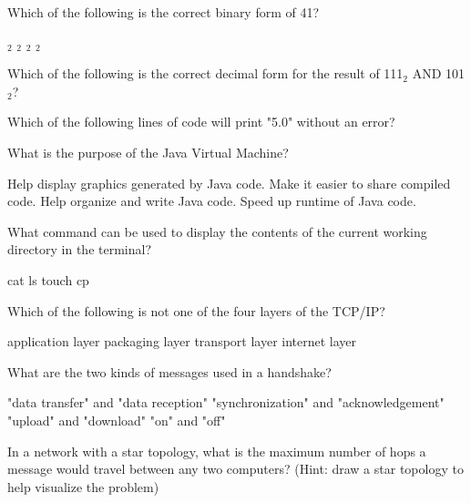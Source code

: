 \documentclass[answers,addpoints]{exam} %
\begin{document}
\begin{questions}
\question[2] Which of the following is the correct binary form of 41?
\begin{choices}
    $_2$
    $_2$
    $_2$
    $_2$
\end{choices}

\question[2] Which of the following is the correct decimal form for the result of 111$_2$ AND 101$_2$?
\begin{choices}
\end{choices}

\question[2] Which of the following lines of code will print "5.0" without an error? 
\begin{choices}
    \CorrectChoice {}
    \choice {}
    \choice {}
    \choice {}
\end{choices}

\question[2] What is the purpose of the Java Virtual Machine? 
\begin{choices}
    \choice Help display graphics generated by Java code. 
    \CorrectChoice Make it easier to share compiled code. 
    \choice Help organize and write Java code. 
    \choice Speed up runtime of Java code. 
\end{choices}

\question[2] What command can be used to display the contents of the current working directory in the terminal?
\begin{choices}
    \choice cat
    \CorrectChoice ls
    \choice touch
    \choice cp
\end{choices}

\question[2] Which of the following is not one of the four layers of the TCP/IP?
\begin{choices}
    \choice application layer
    \CorrectChoice packaging layer
    \choice transport layer
    \choice internet layer
\end{choices}

\question[2] What are the two kinds of messages used in a handshake? 
\begin{choices}
    \choice "data transfer" and "data reception"
    \CorrectChoice "synchronization" and "acknowledgement"
    \choice "upload" and "download"
    \choice "on" and "off" 
\end{choices}

\question[2] In a network with a star topology, what is the maximum number of hops a message would travel between any two computers? (Hint: draw a star topology to help visualize the problem) 
\begin{choices}
\end{choices}


\end{questions}
\end{document}
